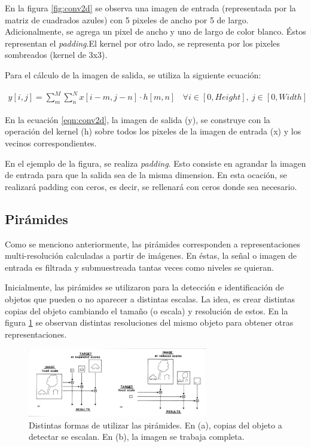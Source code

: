 \par En la figura \ref{fig:conv2d} se observa una imagen de entrada (representada por la matriz de cuadrados azules) con 5 pixeles de ancho por 5 de largo. Adicionalmente, se agrega un pixel de ancho y uno de largo de color blanco. Éstos representan el \textit{padding}.El kernel por otro lado, se representa por los pixeles sombreados (kernel de 3x3).

\par Para el cálculo de la imagen de salida, se utiliza la siguiente ecuación:

\begin{align}
  y[i,j] = \sum_{m}^{M} \sum_{n}^{N} x[i-m, j-n] \cdot h[m,n] \: \: \: \: \forall i \in [0,Height], \: j \in [0,Width]
  \label{eqn:conv2d}
\end{align}

\par En la ecuación \ref{eqn:conv2d}, la imagen de salida (y), se construye con la operación del kernel (h) sobre todos los pixeles de la imagen de entrada (x) y los vecinos correspondientes.

\par En el ejemplo de la figura, se realiza \textit{padding}. Esto consiste en agrandar la imagen de entrada para que la salida sea de la misma dimension. En esta ocación, se realizará padding con ceros, es decir, se rellenará con ceros donde sea necesario.

\subsection{Pirámides}
Como se menciono anteriormente, las pirámides corresponden a representaciones multi-resolución calculadas a partir de imágenes. En éstas, la señal o imagen de entrada es filtrada y submuestreada tantas veces como niveles se quieran.


\par Inicialmente, las pirámides se utilizaron para la detección e identificación de objetos que pueden o no aparecer a distintas escalas. La idea, es crear distintas copias del objeto cambiando el tamaño (o escala) y resolución de estos. En la figura \ref{fig:pyramidPaper} se observan distintas resoluciones del mismo objeto para obtener otras representaciones.

\begin{figure}[H]
  \centering
  \includegraphics[width = 0.7\textwidth]{pyramid_paper.png}
  \caption{Distintas formas de utilizar las pirámides. En (a), copias del objeto a detectar se escalan. En (b), la imagen se trabaja completa. \cite{paperPyramids}}
  \label{fig:pyramidPaper}
\end{figure}


